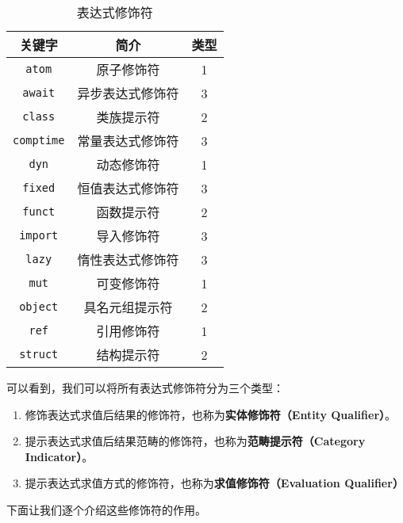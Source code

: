 \begin{table}[!ht]
    \centering
    \begin{tabular}{|c|c|c|} \hline
        关键字 & 简介 & 类型 \\\hline
        \lstinline!atom!        & 原子修饰符         & 1 \\\hline
        \lstinline!await!		& 异步表达式修饰符		& 3 \\\hline
        \lstinline!class!       & 类族提示符         & 2 \\\hline
        \lstinline!comptime!    & 常量表达式修饰符    & 3 \\\hline
        \lstinline!dyn!         & 动态修饰符         & 1 \\\hline
        \lstinline!fixed!		& 恒值表达式修饰符		& 3 \\\hline
        \lstinline!funct!        & 函数提示符         & 2 \\\hline
        \lstinline!import!		& 导入修饰符			& 3 \\\hline
        \lstinline!lazy!        & 惰性表达式修饰符    & 3 \\\hline
        \lstinline!mut!         & 可变修饰符         & 1 \\\hline
        \lstinline!object!      & 具名元组提示符      & 2 \\\hline
        \lstinline!ref!         & 引用修饰符         & 1 \\\hline
        \lstinline!struct!      & 结构提示符         & 2 \\\hline
    \end{tabular}
    \caption{表达式修饰符}
    \label{tab:expression-qualifier}
\end{table}

可以看到，我们可以将所有表达式修饰符分为三个类型：

\begin{enumerate}
    \item 修饰表达式求值后结果的修饰符，也称为\textbf{实体修饰符（Entity Qualifier）}。

    \item 提示表达式求值后结果范畴的修饰符，也称为\textbf{范畴提示符（Category Indicator）}。

    \item 提示表达式求值方式的修饰符，也称为\textbf{求值修饰符（Evaluation Qualifier）}
\end{enumerate}

下面让我们逐个介绍这些修饰符的作用。

